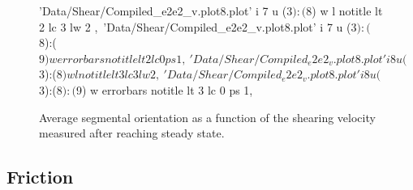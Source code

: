 \documentclass[aps,prb,reprint,superscriptaddress, a4paper]{revtex4-1}
\begin{document}
\begin{figure}
\begin{center}
\begin{gnuplot}[terminal=pdf, terminaloptions={size \SERFigwidth cm, \SERFigheight cm color solid}]
					'Data/Shear/Compiled_e2e2_v.plot8.plot' i 7 u ($3):($8) w l notitle  lt 2 lc 3 lw 2 ,\
					'Data/Shear/Compiled_e2e2_v.plot8.plot' i 7 u ($3):($8):($9) w errorbars notitle  lt 2 lc 0 ps 1,\
					'Data/Shear/Compiled_e2e2_v.plot8.plot' i 8 u ($3):($8) w l notitle  lt 3 lc 3 lw 2 ,\
					'Data/Shear/Compiled_e2e2_v.plot8.plot' i 8 u ($3):($8):($9) w errorbars notitle  lt 3 lc 0 ps 1,\
		\end{gnuplot}
		\caption{Average segmental orientation as a function of the shearing velocity measured after reaching steady state.}
		\label{fig:P2_v}
	\end{center}
 \end{figure}

\subsection{Friction}
\end{document}

